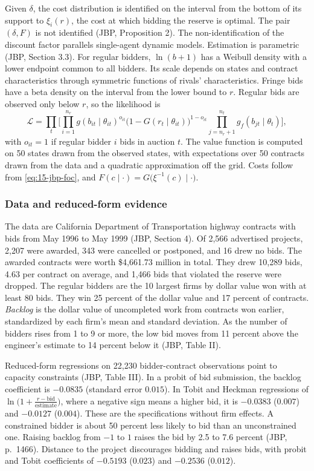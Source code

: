 Given $\delta$, the cost distribution is identified on the interval from the bottom of its support to
$\xi_i(r)$, the cost at which bidding the reserve is optimal. The pair $(\delta,F)$ is not identified
(JBP, Proposition 2). The non-identification of the discount factor parallels single-agent dynamic
models. Estimation is parametric (JBP, Section 3.3). For regular bidders, $\ln(b+1)$ has a Weibull
density with a lower endpoint common to all bidders. Its scale depends on states and contract
characteristics through symmetric functions of rivals' characteristics. Fringe bids have a beta density on
the interval from the lower bound to $r$. Regular bids are observed only below $r$, so the likelihood is
\[
\mathcal L=\prod_t\Big[\prod_{i=1}^{n_r}g(b_{it}\mid\theta_{it})^{o_{it}}\big(1-G(r_t\mid\theta_{it})\big)^{1-o_{it}}
\prod_{j=n_r+1}^{n_t}g_f(b_{jt}\mid\theta_t)\Big],
\]
with $o_{it}=1$ if regular bidder $i$ bids in auction $t$. The value function is computed on 50 states
drawn from the observed states, with expectations over 50 contracts drawn from the data and a
quadratic approximation off the grid. Costs follow from \eqref{eq:15-jbp-foc}, and
$F(c\mid\cdot)=G\big(\xi^{-1}(c)\mid\cdot\big)$.

\subsubsection{Data and reduced-form evidence}

The data are California Department of Transportation highway contracts with bids from May 1996 to May
1999 (JBP, Section 4). Of 2,566 advertised projects, 2,207 were awarded, 343 were cancelled or
postponed, and 16 drew no bids. The awarded contracts were worth \$4,661.73 million in total. They drew
10,289 bids, 4.63 per contract on average, and 1,466 bids that violated the reserve were dropped. The
regular bidders are the 10 largest firms by dollar value won with at least 80 bids. They win 25 percent
of the dollar value and 17 percent of contracts. \emph{Backlog} is the dollar value of uncompleted work
from contracts won earlier, standardized by each firm's mean and standard deviation. As the number of
bidders rises from 1 to 9 or more, the low bid moves from 11 percent above the engineer's estimate to
14 percent below it (JBP, Table II).

Reduced-form regressions on 22,230 bidder-contract observations point to capacity constraints (JBP,
Table III). In a probit of bid submission, the backlog coefficient is $-0.0835$ (standard error
$0.015$). In Tobit and Heckman regressions of $\ln\big(1+\frac{r-\text{bid}}{\text{estimate}}\big)$, where a
negative sign means a higher bid, it is $-0.0383$ ($0.007$) and $-0.0127$ ($0.004$). These are the
specifications without firm effects.
A constrained bidder is about 50 percent less likely to bid than an unconstrained one. Raising backlog
from $-1$ to $1$ raises the bid by 2.5 to 7.6 percent (JBP, p.~1466). Distance to the project
discourages bidding and raises bids, with probit and Tobit coefficients of $-0.5193$ ($0.023$) and
$-0.2536$ ($0.012$).

